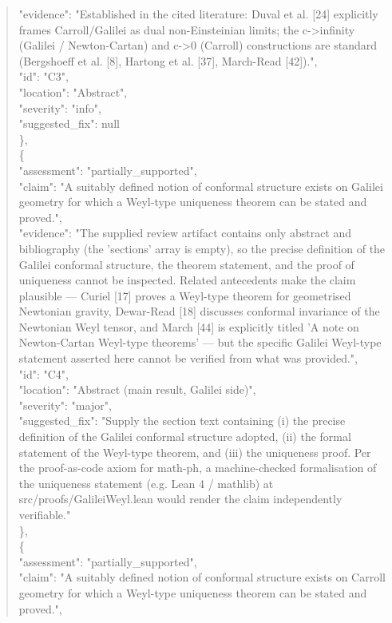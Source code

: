 \documentclass[11pt]{article}
\begin{document}
\begin{quote}
      "evidence": "Established in the cited literature: Duval et al. [24] explicitly frames Carroll/Galilei as dual non-Einsteinian limits; the c->infinity (Galilei / Newton-Cartan) and c->0 (Carroll) constructions are standard (Bergshoeff et al. [8], Hartong et al. [37], March-Read [42]).",\\
      "id": "C3",\\
      "location": "Abstract",\\
      "severity": "info",\\
      "suggested\_fix": null\\
    \},\\
    \{\\
      "assessment": "partially\_supported",\\
      "claim": "A suitably defined notion of conformal structure exists on Galilei geometry for which a Weyl-type uniqueness theorem can be stated and proved.",\\
      "evidence": "The supplied review artifact contains only abstract and bibliography (the 'sections' array is empty), so the precise definition of the Galilei conformal structure, the theorem statement, and the proof of uniqueness cannot be inspected. Related antecedents make the claim plausible — Curiel [17] proves a Weyl-type theorem for geometrised Newtonian gravity, Dewar-Read [18] discusses conformal invariance of the Newtonian Weyl tensor, and March [44] is explicitly titled 'A note on Newton-Cartan Weyl-type theorems' — but the specific Galilei Weyl-type statement asserted here cannot be verified from what was provided.",\\
      "id": "C4",\\
      "location": "Abstract (main result, Galilei side)",\\
      "severity": "major",\\
      "suggested\_fix": "Supply the section text containing (i) the precise definition of the Galilei conformal structure adopted, (ii) the formal statement of the Weyl-type theorem, and (iii) the uniqueness proof. Per the proof-as-code axiom for math-ph, a machine-checked formalisation of the uniqueness statement (e.g. Lean 4 / mathlib) at src/proofs/GalileiWeyl.lean would render the claim independently verifiable."\\
    \},\\
    \{\\
      "assessment": "partially\_supported",\\
      "claim": "A suitably defined notion of conformal structure exists on Carroll geometry for which a Weyl-type uniqueness theorem can be stated and proved.",\\

\end{quote}
\end{document}
